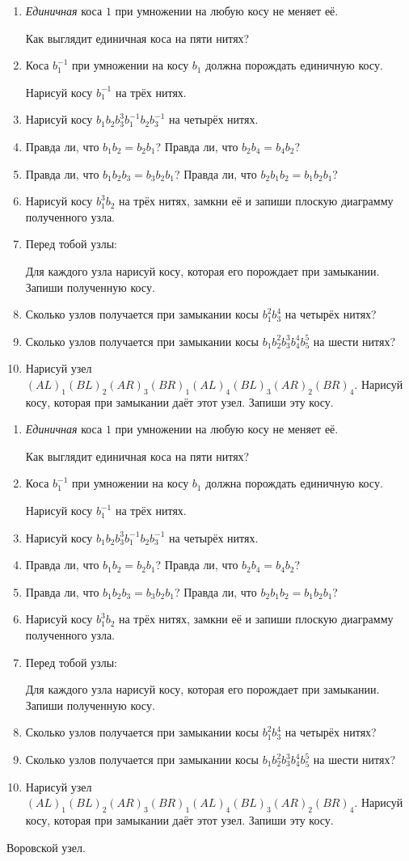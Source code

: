 \documentclass[12pt]{article}
\theoremstyle{definition}
\begin{document}
\newcommand{\daytwo}{
\begin{enumerate}
\item  \textit{Единичная} коса $1$ при умножении на любую косу не меняет её.

Как выглядит единичная коса на пяти нитях?
\item Коса $b_1^{-1}$ при умножении на косу $b_1$ должна порождать единичную косу.

Нарисуй косу $b_1^{-1}$ на трёх нитях.
\item Нарисуй косу $b_1 b_2 b_3^3 b_1^{-1} b_2 b_3^{-1}$ на четырёх нитях.
\item Правда ли, что $b_1 b_2 = b_2 b_1$? Правда ли, что $b_2 b_4 = b_4 b_2$?
\item Правда ли, что $b_1 b_2 b_3 = b_3 b_2 b_1$? Правда ли, что $b_2 b_1 b_2 = b_1 b_2 b_1$?
\item Нарисуй косу $b_1^3 b_2$ на трёх нитях, замкни её и запиши плоскую диаграмму полученного узла.
\item Перед тобой узлы:



Для каждого узла нарисуй косу, которая его порождает при замыкании. 
Запиши полученную косу.
\item Сколько узлов получается при замыкании косы $b_1^2 b_3^4$ на четырёх нитях?
\item Сколько узлов получается при замыкании косы $b_1 b_2^2 b_3^3 b_4^4 b_5^5$ на шести нитях?
\item Нарисуй узел $(AL)_1 (BL)_2 (AR)_3 (BR)_1 (AL)_4 (BL)_3 (AR)_2 (BR)_4$.
Нарисуй косу, которая при замыкании даёт этот узел. Запиши эту косу. 
\end{enumerate}
}

\newpage
\daytwo
\vfill
\daytwo

\newpage

Воровской узел. 
\end{document}
